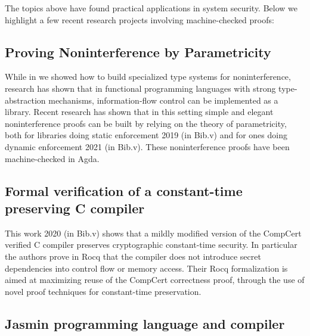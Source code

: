 \documentclass[12pt]{report}
\begin{document}
 The topics above have found practical applications in system security. Below
    we highlight a few recent research projects involving machine-checked proofs: 
\begin{coqdoccode}
\coqdocemptyline
\end{coqdoccode}
\subsection{Proving Noninterference by Parametricity}



 While in  we showed how to build specialized type systems
    for noninterference, research has shown that in functional programming
    languages with strong type-abstraction mechanisms, information-flow control
    can be implemented as a library. Recent research has shown that in this
    setting simple and elegant noninterference proofs can be built by relying on
    the theory of parametricity, both for libraries doing static enforcement
       2019 (in Bib.v) and for ones doing dynamic enforcement
       2021 (in Bib.v). These noninterference proofs have been
    machine-checked in Agda. 
\begin{coqdoccode}
\coqdocemptyline
\end{coqdoccode}
\subsection{Formal verification of a constant-time preserving C compiler}



 This work    2020 (in Bib.v) shows that a mildly modified version of
    the CompCert verified C compiler preserves cryptographic constant-time
    security. In particular the authors prove in Rocq that the compiler does
    not introduce secret dependencies into control flow or memory access. Their
    Rocq formalization is aimed at maximizing reuse of the CompCert correctness
    proof, through the use of novel proof techniques for constant-time
    preservation. 
\begin{coqdoccode}
\coqdocemptyline
\end{coqdoccode}
\subsection{Jasmin programming language and compiler}
\end{document}
